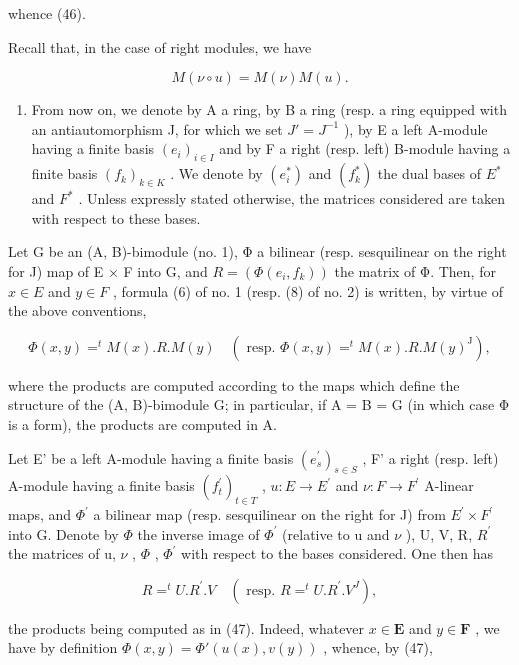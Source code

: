 whence (46).

Recall that, in the case of right modules, we have

\[
M (\nu \circ u) = M (\nu) M (u).
\]

\begin{enumerate}
\def\labelenumi{\Roman{enumi}.}
\setcounter{enumi}{2}
\tightlist
\item
  From now on, we denote by A a ring, by B a ring (resp. a ring equipped with an antiautomorphism J, for which we set \(J' = J^{-1}\) ), by E a left A-module having a finite basis \((e_i)_{i \in I}\) and by F a right (resp. left) B-module having a finite basis \((f_k)_{k \in K}\) . We denote by \((e_i^*)\) and \((f_k^*)\) the dual bases of \(E^*\) and \(F^*\) . Unless expressly stated otherwise, the matrices considered are taken with respect to these bases.
\end{enumerate}

Let G be an (A, B)-bimodule (no. 1), Φ a bilinear (resp. sesquilinear on the right for J) map of E × F into G, and \(R = (\Phi(e_i, f_k))\) the matrix of Φ. Then, for \(x \in E\) and \(y \in F\) , formula (6) of no. 1 (resp. (8) of no. 2) is written, by virtue of the above conventions,

\[
\Phi (x, y) = ^ {t} M (x). R. M (y) \quad (\text { resp. } \Phi (x, y) = ^ {t} M (x). R. M (y) ^ {\mathrm{J}}),\tag{47}
\]

where the products are computed according to the maps which define the structure of the (A, B)-bimodule G; in particular, if A = B = G (in which case Φ is a form), the products are computed in A.

Let E' be a left A-module having a finite basis \((e_{s}^{\prime})_{s\in S}\) , F' a right (resp. left) A-module having a finite basis \((f_{t}^{\prime})_{t\in T}\) , \(u:E\to E^{\prime}\) and \(\nu:F\to F^{\prime}\) A-linear maps, and \(\Phi^{\prime}\) a bilinear map (resp. sesquilinear on the right for J) from \(E^{\prime}\times F^{\prime}\) into G. Denote by \(\Phi\) the inverse image of \(\Phi^{\prime}\) (relative to u and \(\nu\) ), U, V, R, \(R^{\prime}\) the matrices of u, \(\nu\) , \(\Phi\) , \(\Phi^{\prime}\) with respect to the bases considered. One then has

\[
R = ^ {t} U. R ^ {\prime}. V \quad (\text { resp. } R = ^ {t} U. R ^ {\prime}. V ^ {J}),\tag{48}
\]

the products being computed as in (47). Indeed, whatever \(x \in \mathbf{E}\) and \(y \in \mathbf{F}\) , we have by definition \(\Phi(x, y) = \Phi'(u(x), v(y))\) , whence, by (47),

